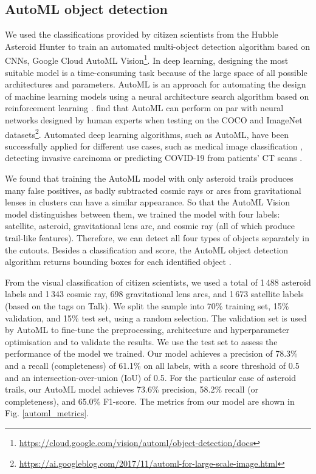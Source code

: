 \documentclass{aa}
\begin{document}
\subsection{AutoML object detection}
\label{automl}

We used the classifications provided by citizen scientists from the Hubble Asteroid Hunter to train an automated multi-object detection algorithm based on CNNs, Google Cloud AutoML Vision\footnote{\url{https://cloud.google.com/vision/automl/object-detection/docs}}. In deep learning, designing the most suitable model is a time-consuming task because of the large space of all possible architectures and parameters. AutoML is an approach for automating the design of machine learning models using a neural architecture search algorithm based on reinforcement learning \citep{Zoph2016}. \citet{Zoph2017} find that AutoML can perform on par with neural networks designed by human experts when testing on the COCO and ImageNet datasets\footnote{\url{https://ai.googleblog.com/2017/11/automl-for-large-scale-image.html}}. Automated deep learning algorithms, such as AutoML, have been successfully applied for different use cases, such as medical image classification \citep{Faes2019, Korot2021}, detecting invasive carcinoma \citep{Zeng2020} or predicting COVID-19 from patients' CT scans \citep{Arellano2021}.

We found that training the AutoML model with only asteroid trails produces many false positives, as badly subtracted cosmic rays or arcs from gravitational lenses in clusters can have a similar appearance. So that the AutoML Vision model distinguishes between them, we trained the model with four labels: satellite, asteroid, gravitational lens arc, and cosmic ray (all of which produce trail-like features). Therefore, we can detect all four types of objects separately in the cutouts. Besides a classification and score, the AutoML object detection algorithm returns bounding boxes for each identified object \citep{Xin2019}.

From the visual classification of citizen scientists, we used a total of 1\,488 asteroid labels and 1\,343 cosmic ray, 698 gravitational lens arcs, and 1\,673 satellite labels (based on the tags on Talk). We split the sample into 70\% training set, 15\% validation, and 15\% test set, using a random selection. The validation set is used by AutoML to fine-tune the preprocessing, architecture and hyperparameter optimisation and to validate the results. We use the test set to assess the performance of the model we trained. Our model achieves a precision of 78.3\% and a recall (completeness) of 61.1\% on all labels, with a score threshold of 0.5 and an intersection-over-union (IoU) of 0.5. For the particular case of asteroid trails, our AutoML model achieves 73.6\% precision, 58.2\% recall (or completeness), and 65.0\% F1-score. The metrics from our model are shown in Fig. \ref{automl_metrics}.
\end{document}
